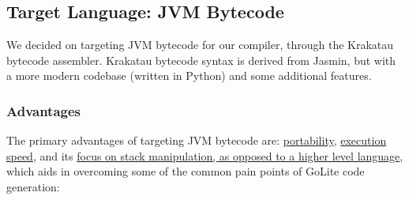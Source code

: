 \documentclass[11pt]{article}
\begin{document}

\subsection{Target Language: JVM Bytecode}
We decided on targeting JVM bytecode for our compiler, through the
Krakatau\cite{krakatau} bytecode
assembler. Krakatau bytecode syntax is derived from Jasmin, but with a
more modern codebase (written in Python) and some additional features.
\subsubsection{Advantages}
The primary advantages of targeting JVM bytecode are:
\hyperref[sec:portability]{portability},
\hyperref[sec:execs]{execution speed}, and its
\hyperref[sec:stack]{focus on stack manipulation, as opposed to a
  higher level language}, which aids in overcoming some of the common
pain points of GoLite code generation:
\end{document}

